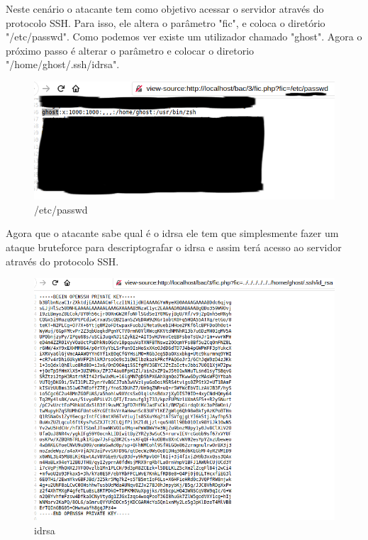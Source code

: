 \documentclass{report}
\begin{document}
Neste cenário o atacante tem como objetivo acessar o servidor através do protocolo SSH. Para isso, ele altera o parâmetro "fic", e coloca o diretório "/etc/passwd".
Como podemos ver existe um utilizador chamado "ghost". Agora o próximo passo é alterar o parâmetro e colocar o diretorio "/home/ghost/.ssh/id\textunderscore rsa".

\begin{figure}[!htb]
\centering
{}
  \includegraphics[width=\linewidth]{lfi/lfi2.png}
  \caption{/etc/passwd}\label{fig:passwd}
\endminipage
\end{figure}

Agora que o atacante sabe qual é o id\textunderscore rsa ele tem que simplesmente fazer um ataque bruteforce para descriptografar o id\textunderscore rsa e assim terá acesso ao servidor através do protocolo SSH.

\begin{figure}[!htb]
\centering
{}
  \includegraphics[width=\linewidth]{lfi/lfi3.png}
  \caption{id\textunderscore rsa}\label{fig:id_rsa}
\endminipage
\end{figure}
\end{document}
